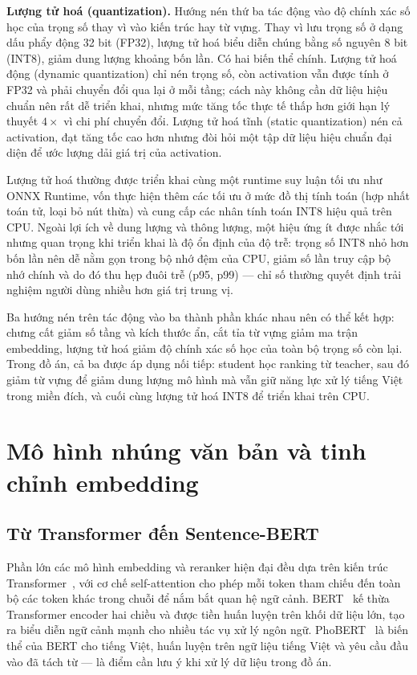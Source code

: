 \documentclass[../DoAn.tex]{subfiles}
\begin{document}
\noindent\textbf{Lượng tử hoá (quantization).} Hướng nén thứ ba tác động vào độ chính xác số học của trọng số thay vì vào kiến trúc hay từ vựng. Thay vì lưu trọng số ở dạng dấu phẩy động 32 bit (FP32), lượng tử hoá biểu diễn chúng bằng số nguyên 8 bit (INT8), giảm dung lượng khoảng bốn lần. Có hai biến thể chính. Lượng tử hoá động (dynamic quantization) chỉ nén trọng số, còn activation vẫn được tính ở FP32 và phải chuyển đổi qua lại ở mỗi tầng; cách này không cần dữ liệu hiệu chuẩn nên rất dễ triển khai, nhưng mức tăng tốc thực tế thấp hơn giới hạn lý thuyết $4\times$ vì chi phí chuyển đổi. Lượng tử hoá tĩnh (static quantization) nén cả activation, đạt tăng tốc cao hơn nhưng đòi hỏi một tập dữ liệu hiệu chuẩn đại diện để ước lượng dải giá trị của activation.

Lượng tử hoá thường được triển khai cùng một runtime suy luận tối ưu như ONNX Runtime, vốn thực hiện thêm các tối ưu ở mức đồ thị tính toán (hợp nhất toán tử, loại bỏ nút thừa) và cung cấp các nhân tính toán INT8 hiệu quả trên CPU. Ngoài lợi ích về dung lượng và thông lượng, một hiệu ứng ít được nhắc tới nhưng quan trọng khi triển khai là độ ổn định của độ trễ: trọng số INT8 nhỏ hơn bốn lần nên dễ nằm gọn trong bộ nhớ đệm của CPU, giảm số lần truy cập bộ nhớ chính và do đó thu hẹp đuôi trễ (p95, p99) --- chỉ số thường quyết định trải nghiệm người dùng nhiều hơn giá trị trung vị.

Ba hướng nén trên tác động vào ba thành phần khác nhau nên có thể kết hợp: chưng cất giảm số tầng và kích thước ẩn, cắt tỉa từ vựng giảm ma trận embedding, lượng tử hoá giảm độ chính xác số học của toàn bộ trọng số còn lại. Trong đồ án, cả ba được áp dụng nối tiếp: student học ranking từ teacher, sau đó giảm từ vựng để giảm dung lượng mô hình mà vẫn giữ năng lực xử lý tiếng Việt trong miền đích, và cuối cùng lượng tử hoá INT8 để triển khai trên CPU.

\section{Mô hình nhúng văn bản và tinh chỉnh embedding}
\label{section:2.4}

\subsection{Từ Transformer đến Sentence-BERT}
\label{subsection:2.4.1}

Phần lớn các mô hình embedding và reranker hiện đại đều dựa trên kiến trúc Transformer~\cite{vaswani2017attention}, với cơ chế self-attention cho phép mỗi token tham chiếu đến toàn bộ các token khác trong chuỗi để nắm bắt quan hệ ngữ cảnh. BERT~\cite{devlin2019bert} kế thừa Transformer encoder hai chiều và được tiền huấn luyện trên khối dữ liệu lớn, tạo ra biểu diễn ngữ cảnh mạnh cho nhiều tác vụ xử lý ngôn ngữ. PhoBERT~\cite{nguyen2020phobert} là biến thể của BERT cho tiếng Việt, huấn luyện trên ngữ liệu tiếng Việt và yêu cầu đầu vào đã tách từ --- là điểm cần lưu ý khi xử lý dữ liệu trong đồ án.
\end{document}
